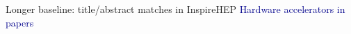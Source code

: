 \documentclass[aspectratio=169]{beamer}
\begin{document}
\begin{frame}{Longer baseline: title/abstract matches in InspireHEP}
\vspace{0.35 cm}
\textcolor{darkblue}{Hardware accelerators in  papers}

\begin{columns}
\end{columns}
\end{frame}
\end{document}
